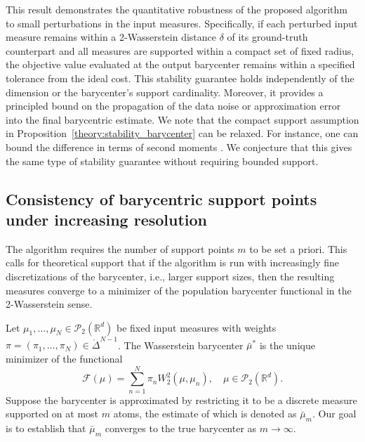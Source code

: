 \documentclass[11pt]{article}
\newcommand{\bbR}{\mathbb{R}}
\newcommand{\calF}{\mathcal{F}}
\newcommand{\calP}{\mathcal{P}}
\begin{document}
This result demonstrates the quantitative robustness of the proposed algorithm to small perturbations in the input measures. Specifically, if each perturbed input measure remains within a 2-Wasserstein distance $\delta$ of its ground-truth counterpart and all measures are supported within a compact set of fixed radius, the objective value evaluated at the output barycenter remains within a specified tolerance from the ideal cost. This stability guarantee holds independently of the dimension or the barycenter's support cardinality. Moreover, it provides a principled bound on the propagation of the data noise or approximation error into the final barycentric estimate. We note that the compact support assumption  in Proposition~\ref{theory:stability_barycenter} can be relaxed. For instance, one can bound the difference in terms of second moments \citep{villani_2003_TopicsOptimalTransportation}. We conjecture that this gives the same type of stability guarantee without requiring bounded support.


\subsection{Consistency of barycentric support points under increasing resolution}

The algorithm requires the number of support points $m$ to be set a priori. This calls for theoretical support that if the algorithm is run with increasingly fine discretizations of the barycenter, i.e., larger support sizes, then the resulting measures converge to a minimizer of the population barycenter functional in the 2-Wasserstein sense.

Let $\mu_1, \ldots, \mu_N \in \calP_2(\bbR^d)$ be fixed input measures with weights $\pi = (\pi_1, \ldots, \pi_N)\in\mathring{\Delta}^{N-1}$. The Wasserstein barycenter $\bar{\mu}^*$ is the unique minimizer of the functional 
\begin{equation*}
    \calF(\mu) = \sum_{n=1}^N \pi_n W_2^2(\mu,\mu_n),\quad \mu\in \calP_2(\bbR^d).
\end{equation*}
Suppose the barycenter is approximated by restricting it to be a discrete measure supported on at most $m$ atoms, the estimate of which is denoted as $\bar{\mu}_m$. Our goal is to establish that $\bar{\mu}_m$ converges to the true barycenter as $m\to\infty$.
\end{document}
